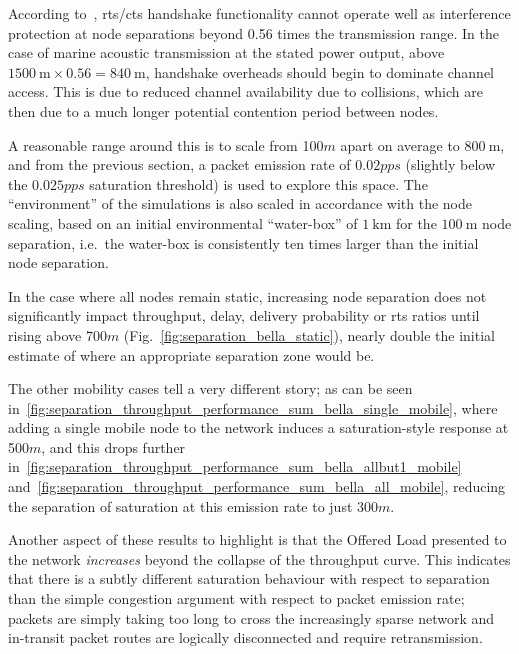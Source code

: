 According to~\citet{Xu2002}, \gls{rts}/\gls{cts} handshake functionality cannot operate well as interference protection at node separations beyond 0.56 times the transmission range\cite{Xu2002}.
In the case of marine acoustic transmission at the stated power output, above $\SI{1500}{\meter} \times 0.56 = \SI{840}{\meter}$, handshake overheads should begin to dominate channel access.
This is due to reduced channel availability due to collisions, which are then due to a much longer potential contention period between nodes. 

A reasonable range around this is to scale from 100$m$ apart on average to $\SI{800}{\meter}$, and from the previous section, a packet emission rate of $0.02pps$ (slightly below the $0.025pps$ saturation threshold) is used to explore this space.
The ``environment'' of the simulations is also scaled in accordance with the node scaling, based on an initial environmental ``water-box'' of $\SI{1}{\kilo\meter}$ for the $\SI{100}{\meter}$ node separation, i.e.\ the water-box is consistently ten times larger than the initial node separation.

In the case where all nodes remain static, increasing node separation does not significantly impact throughput, delay, delivery probability or \gls{rts} ratios until rising above 700$m$ (Fig.~\ref{fig:separation_bella_static}), nearly double the initial estimate of where an appropriate separation zone would be.

The other mobility cases tell a very different story; as can be seen in~\autoref{fig:separation_throughput_performance_sum_bella_single_mobile}, where adding a single mobile node to the network induces a saturation-style response at 500$m$, and this drops further in~\autoref{fig:separation_throughput_performance_sum_bella_allbut1_mobile} and~\autoref{fig:separation_throughput_performance_sum_bella_all_mobile}, reducing the separation of saturation at this emission rate to just 300$m$.

Another aspect of these results to highlight is that the Offered Load presented to the network \emph{increases} beyond the collapse of the throughput curve. 
This indicates that there is a subtly different saturation behaviour with respect to separation than the simple congestion argument with respect to packet emission rate; packets are simply taking too long to cross the increasingly sparse network and in-transit packet routes are logically disconnected and require retransmission.



